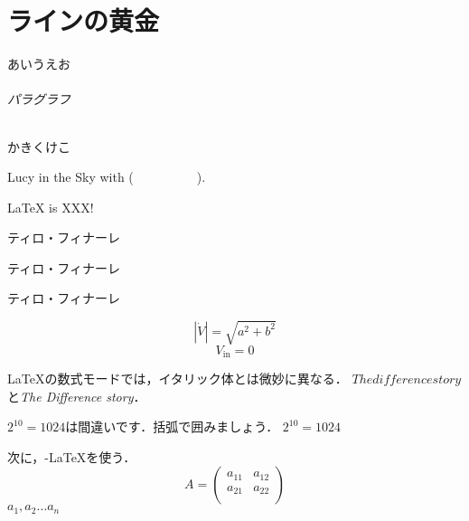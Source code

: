 \documentclass{jsarticle}
\newcommand{\abs}[1]{\left| #1 \right|}
\newcommand{\suffix}[2]{#1_\mathrm{#2}}
\newcommand{\mami}{\begin{center}ティロ・フィナーレ\end{center}}
\begin{document}
\part{ラインの黄金}
あいうえお
\paragraph{パラグラフ}
かきくけこ

Lucy in the Sky with (\ \ \ \ \ \ \ \ \ \ ).

\LaTeX{} is XXX!

 \par
\mami
\mami
\mami
\[ \abs{\dot{V}} = \sqrt{a^2+b^2} \]
\[ \suffix{V}{in} = 0 \]

\LaTeX の数式モードでは，イタリック体とは微妙に異なる．
$The difference story$と\textit{The Difference story}．\par

$2^10 = 1024$は間違いです．括弧で囲みましょう． $2^{10} = 1024$

次に，\AmS-\LaTeX を使う．
\begin{equation}
    A = \begin{pmatrix}
        a_{11} & a_{12} \\
        a_{21} & a_{22} \\
    \end{pmatrix}
\end{equation}
$ a_1, a_2 \dots a_n$
\end{document}
